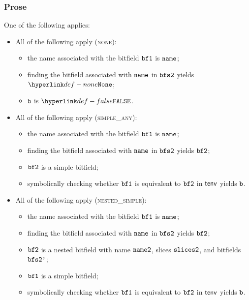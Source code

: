 \subsubsection{Prose}
One of the following applies:
\begin{itemize}
  \item All of the following apply (\textsc{none}):
  \begin{itemize}
    \item the name associated with the bitfield $\texttt{bf1}$ is $\texttt{name}$;
    \item finding the bitfield associated with $\texttt{name}$ in $\texttt{bfs2}$ yields $\None$;
    \item $\texttt{b}$ is $\False$.
  \end{itemize}

  \item All of the following apply (\textsc{simple\_any}):
  \begin{itemize}
    \item the name associated with the bitfield $\texttt{bf1}$ is $\texttt{name}$;
    \item finding the bitfield associated with $\texttt{name}$ in $\texttt{bfs2}$ yields $\texttt{bf2}$;
    \item $\texttt{bf2}$ is a simple bitfield;
    \item symbolically checking whether $\texttt{bf1}$ is equivalent to $\texttt{bf2}$ in $\textsf{tenv}$ yields $\texttt{b}$.
  \end{itemize}

  \item All of the following apply (\textsc{nested\_simple}):
  \begin{itemize}
    \item the name associated with the bitfield $\texttt{bf1}$ is $\texttt{name}$;
    \item finding the bitfield associated with $\texttt{name}$ in $\texttt{bfs2}$ yields $\texttt{bf2}$;
    \item $\texttt{bf2}$ is a nested bitfield with name $\texttt{name2}$, slices $\texttt{slices2}$, and bitfields $\texttt{bfs2'}$;
    \item $\texttt{bf1}$ is a simple bitfield;
    \item symbolically checking whether $\texttt{bf1}$ is equivalent to $\texttt{bf2}$ in $\textsf{tenv}$ yields $\texttt{b}$.
  \end{itemize}


\end{itemize}
